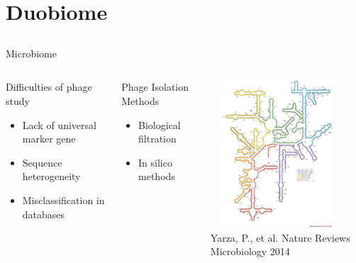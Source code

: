 \documentclass[11pt]{beamer}
\begin{document}
\section{Duobiome}
\subsection{}

	
	\begin{frame}{Microbiome}
	\begin{columns}
	\begin{block}{Difficulties of phage study}
	\begin{itemize}
		\item Lack of universal marker gene
		\item Sequence heterogeneity 
		\item Misclassification in databases
	\end{itemize}
	\end{block}
		
		
	\begin{block}{Phage Isolation Methods}
	\begin{itemize}
		\item Biological filtration
		\item In silico methods
	\end{itemize}
	\end{block}
	
	\includegraphics[height=5.5cm, width=5cm]{ribosome.jpg} \\
	\tiny{Yarza, P., et al. Nature Reviews Microbiology 2014}
	\end{columns}
		
	
	\end{frame}
\end{document}
